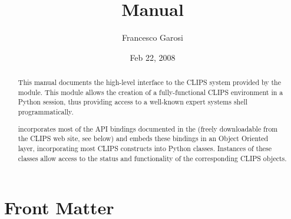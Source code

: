 \documentclass{manual}
\title{\pyclips{} Manual}
\author{Francesco Garosi}
\date{Feb 22, 2008}
\begin{document}
\maketitle

\ifhtml
\chapter*{Front Matter\label{front}}
\fi



\begin{abstract}

\noindent
This manual documents the high-level interface to the CLIPS system
provided by the \pyclips{} module. This module allows the creation of a
fully-functional CLIPS environment in a Python session, thus providing
access to a well-known expert systems shell programmatically.

\pyclips{} incorporates most of the API bindings documented in the
\clipsapg{} (freely downloadable from the CLIPS web site, see below) and
embeds these bindings in an Object Oriented layer, incorporating most
CLIPS constructs into Python classes. Instances of these classes allow
access to the status and functionality of the corresponding CLIPS objects.

\end{abstract}


\begin{seealso}
\end{seealso}

\tableofcontents


\end{document}
